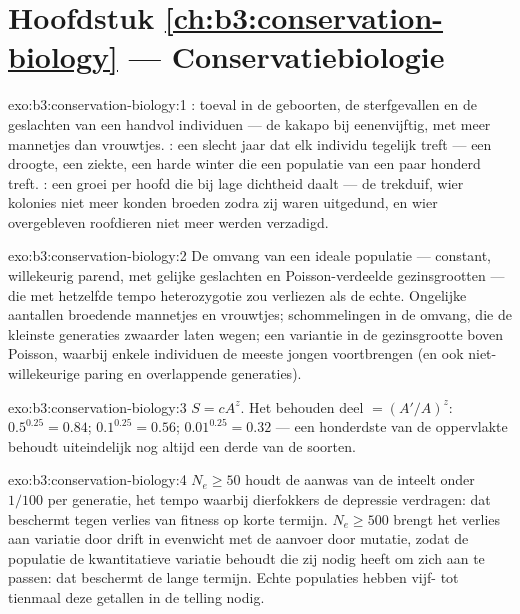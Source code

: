 \section*{Hoofdstuk \ref{ch:b3:conservation-biology} --- Conservatiebiologie}

\begin{solution}{exo:b3:conservation-biology:1}
: toeval in de geboorten, de sterfgevallen
en de geslachten van een handvol individuen --- de kakapo bij
eenenvijftig, met meer mannetjes dan vrouwtjes. : een slecht jaar dat elk individu tegelijk treft --- een
droogte, een ziekte, een harde winter die een populatie van een paar
honderd treft. : een groei per hoofd die bij lage dichtheid
daalt --- de trekduif, wier kolonies niet meer konden broeden zodra zij
waren uitgedund, en wier overgebleven roofdieren niet meer werden
verzadigd.
\end{solution}

\begin{solution}{exo:b3:conservation-biology:2}
De omvang van een ideale populatie --- constant, willekeurig parend,
met gelijke geslachten en Poisson-verdeelde gezinsgrootten --- die met
hetzelfde tempo heterozygotie zou verliezen als de echte. Ongelijke
aantallen broedende mannetjes en vrouwtjes; schommelingen in de omvang,
die de kleinste generaties zwaarder laten wegen; een variantie in de
gezinsgrootte boven Poisson, waarbij enkele individuen de meeste jongen
voortbrengen (en ook niet-willekeurige paring en overlappende
generaties).
\end{solution}

\begin{solution}{exo:b3:conservation-biology:3}
$S = cA^{z}$. Het behouden deel $= (A'/A)^{z}$: $0.5^{0.25} = 0.84$;
$0.1^{0.25} = 0.56$; $0.01^{0.25} = 0.32$ --- een honderdste van de
oppervlakte behoudt uiteindelijk nog altijd een derde van de soorten.
\end{solution}

\begin{solution}{exo:b3:conservation-biology:4}
$N_{e} \ge 50$ houdt de aanwas van de inteelt onder $1/100$ per
generatie, het tempo waarbij dierfokkers de depressie verdragen: dat
beschermt tegen verlies van fitness op korte termijn. $N_{e} \ge
500$ brengt het verlies aan variatie door drift in evenwicht met de
aanvoer door mutatie, zodat de populatie de kwantitatieve variatie
behoudt die zij nodig heeft om zich aan te passen: dat beschermt de
lange termijn. Echte populaties hebben vijf- tot tienmaal deze getallen
in de telling nodig.
\end{solution}

